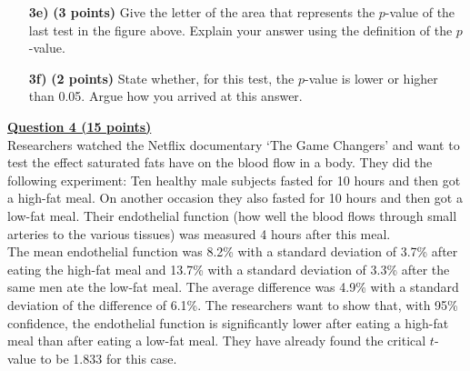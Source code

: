 \begin{itemize}

\item[\textbf{3e)}] \textbf{(3 points)} Give the letter of the area that represents the $p$-value of the last test in the figure above. Explain your answer using the definition of the $p$-value.

\item[\textbf{3f)}] \textbf{(2 points)} State whether, for this test, the $p$-value is lower or higher than 0.05. Argue how you arrived at this answer.
    
\end{itemize}

\clearpage %

\underline{\textbf{Question 4 (15 points)}} \\

Researchers watched the Netflix documentary ‘The Game Changers’ and want to test the effect saturated fats have on the blood flow in a body. They did the following experiment: Ten healthy male subjects fasted for 10 hours and then got a high-fat meal. On another occasion they also fasted for 10 hours and then got a low-fat meal. Their endothelial function (how well the blood flows through small arteries to the various tissues) was measured 4 hours after this meal. \\

The mean endothelial function was 8.2\% with a standard deviation of 3.7\% after eating the high-fat meal and 13.7\% with a standard deviation of 3.3\% after the same men ate the low-fat meal. The average difference was 4.9\% with a standard deviation of the difference of 6.1\%. The researchers want to show that, with 95\% confidence, the endothelial function is significantly lower after eating a high-fat meal than after eating a low-fat meal. They have already found the critical $t$-value to be 1.833 for this case.

